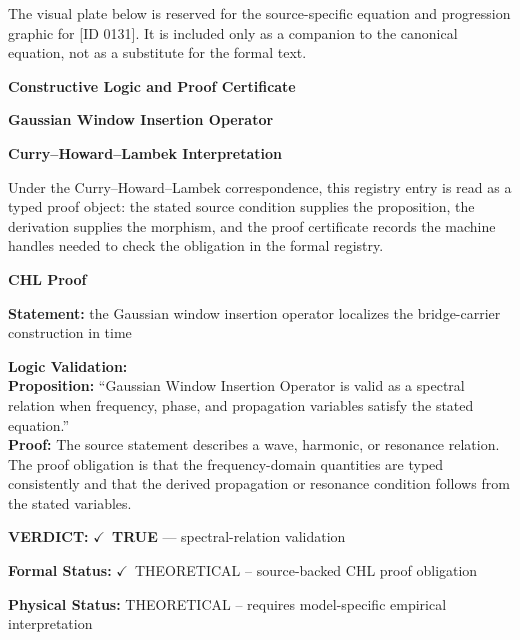 \begingroup\footnotesize\sloppy
The visual plate below is reserved for the source-specific equation and progression graphic for [ID 0131]. It is included only as a companion to the canonical equation, not as a substitute for the formal text.
\par\endgroup
\ifTZPDarkEdition
{}
\fi

\clearpage
\begingroup\tzpsupportsetup
\noindent\textbf{\fontsize{10.8pt}{12.8pt}\selectfont [ID 0131] Constructive Logic and Proof Certificate}\par
\noindent\textbf{\fontsize{10pt}{12pt}\selectfont Gaussian Window Insertion Operator}\par
\vspace{0.45em}
\begingroup
\footnotesize
\setlength{\parskip}{0.22em}
\setlength{\parindent}{0pt}
\noindent\textbf{Curry--Howard--Lambek Interpretation}\par
Under the Curry--Howard--Lambek correspondence, this registry entry is read as a typed proof
object: the stated source condition supplies the proposition, the derivation supplies the
morphism, and the proof certificate records the machine handles needed to check the obligation
in the formal registry.

\vspace{0.45em}
\noindent\textbf{CHL Proof}\par
\textbf{Statement:} the Gaussian window insertion operator localizes the bridge-carrier construction in time

\textbf{Logic Validation:}\\
\textbf{Proposition:} ``Gaussian Window Insertion Operator is valid as a spectral relation when frequency,
phase, and propagation variables satisfy the stated equation.''\\
\textbf{Proof:} The source statement describes a wave, harmonic, or resonance relation. The proof
obligation is that the frequency-domain quantities are typed consistently and that the
derived propagation or resonance condition follows from the stated variables.

\textbf{VERDICT:} \ensuremath{\checkmark}\ \textbf{TRUE} --- spectral-relation validation

\textbf{Formal Status:} \ensuremath{\checkmark}\ THEORETICAL -- source-backed CHL proof obligation

\textbf{Physical Status:} THEORETICAL -- requires model-specific empirical interpretation
\par\vspace{0.45em}
\par
\ifTZPDarkEdition
{}
\fi
\endgroup
\endgroup

